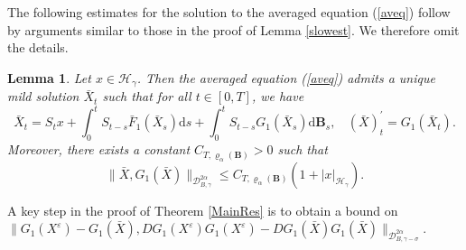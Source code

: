 \documentclass[10pt,a4paper]{article}
\newtheorem{lemma}{Lemma}[section]
\numberwithin{equation}{section}
\begin{document}
	











The following estimates for the solution to the averaged equation (\ref{aveq}) follow by arguments similar to those in the proof of Lemma \ref{slowest}. We therefore omit the details.


\begin{lemma}\label{barXest}
	Let $ x \in \mathcal{H}_\gamma $. Then the averaged equation (\ref{aveq}) admits a unique mild solution $\bar{X}_t$ such that for all $t \in [0,T]$, we have
	\begin{equation*}
	\bar{X}_t = S_t x + \int_0^t S_{t-s} \bar{F}_1(\bar{X}_s) \mathrm{d} s + \int_0^t S_{t-s} G_1(\bar{X}_s)  \mathrm{d} \mathbf B_s, ~~~~(\bar{X})_t^\prime=G_1(\bar{X}_t).	
	\end{equation*}
	Moreover, there exists a constant $ C_{T,\varrho_{\alpha}(\mathbf{B})} > 0 $ such that
	\begin{equation*}
		\|\bar{X},G_1(\bar{X})\|_{\mathcal{D}_{B,\gamma}^{2\alpha}} \leq  C_{T,\varrho_{\alpha}(\mathbf{B})} (1+|x|_{\mathcal H_\gamma}) .
	\end{equation*}
\end{lemma}



A key step in the proof of Theorem \ref{MainRes} is to obtain a bound on
$\|G_1(X^\varepsilon)-G_1(\bar{X}),DG_1(X^\varepsilon)G_1(X^\varepsilon)-DG_1(\bar{X})G_1(\bar{X})\|_{\mathcal{D}_{B,\gamma-\sigma}^{2\alpha} }$.
\end{document}
